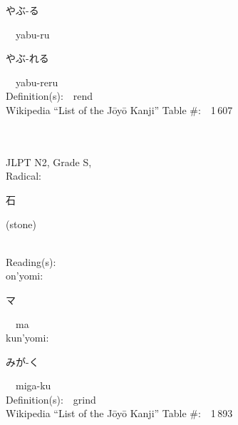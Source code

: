 \begin{multicols}{2}
{\hspace*{2em}}{\begin{CJK}{UTF8}{min} やぶ-る \end{CJK}}\ \ yabu-ru\ \ \\
{\hspace*{2em}}{\begin{CJK}{UTF8}{min} やぶ-れる \end{CJK}}\ \ yabu-reru\ \ \\
Definition(s):\ \ rend \\
Wikipedia ``List of the J\=oy\=o Kanji'' Table \#:\ \ 1\,607 \\
\ \ \\
{\fontsize{34pt}{40pt}  }\ \ \\  %
{JLPT N2, Grade S, \\Radical:\ \ {\begin{CJK}{UTF8}{min} 石 \end{CJK}} (stone) } \\
Reading(s):\ \ \\
{\hspace*{1em}}on'yomi:\ \ \\
{\hspace*{2em}}{\begin{CJK}{UTF8}{min} マ \end{CJK}}\ \ ma\ \ \\
{\hspace*{1em}}kun'yomi:\ \ \\
{\hspace*{2em}}{\begin{CJK}{UTF8}{min} みが-く \end{CJK}}\ \ miga-ku\ \ \\
Definition(s):\ \ grind \\
Wikipedia ``List of the J\=oy\=o Kanji'' Table \#:\ \ 1\,893 \\
\ \ \\
\end{multicols}




